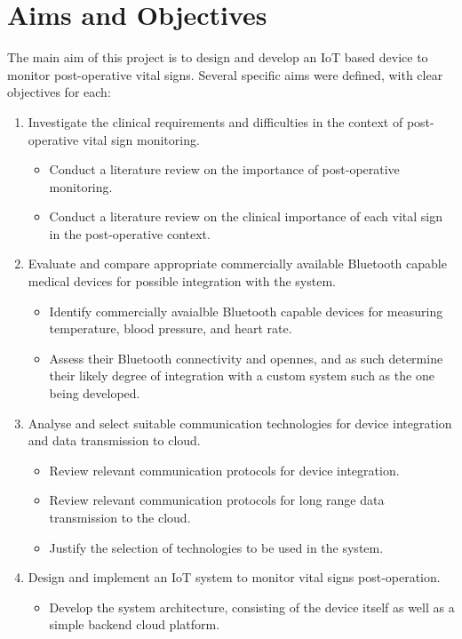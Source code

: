 \section{Aims and Objectives} %
The main aim of this project is to design and develop an IoT based device to monitor post-operative vital signs. Several specific aims were defined, with clear objectives for each:
\begin{enumerate}
	\item Investigate the clinical requirements and difficulties in the context of post-operative vital sign monitoring.
	\begin{itemize}
		\item Conduct a literature review on the importance of post-operative monitoring.
		\item Conduct a literature review on the clinical importance of each vital sign in the post-operative context.
	\end{itemize}
	\item Evaluate and compare appropriate commercially available Bluetooth capable medical devices for possible integration with the system.
	\begin{itemize}
		\item Identify commercially avaialble Bluetooth capable devices for measuring temperature, blood pressure, and heart rate.
		\item Assess their Bluetooth connectivity and opennes, and as such determine their likely degree of integration with a custom system such as the one being developed.
	\end{itemize}
	\item Analyse and select suitable communication technologies for device integration and data transmission to cloud.
	\begin{itemize}
		\item Review relevant communication protocols for device integration.
		\item Review relevant communication protocols for long range data transmission to the cloud.
		\item Justify the selection of technologies to be used in the system.
	\end{itemize}
	\item Design and implement an IoT system to monitor vital signs post-operation.
	\begin{itemize}
		\item Develop the system architecture, consisting of the device itself as well as a simple backend cloud platform.

\end{itemize}
\end{enumerate}
